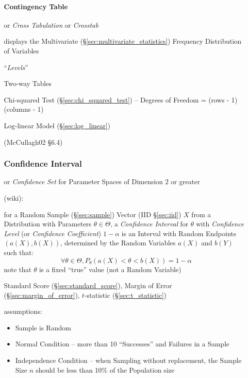 \paragraph{Contingency Table}\label{sec:contingency_table}\hfill

or \emph{Cross Tabulation} or \emph{Crosstab}

displays the Multivariate (\S\ref{sec:multivariate_statistics}) Frequency
Distribution of Variables

``\emph{Levels}''

Two-way Tables

Chi-squared Test (\S\ref{sec:chi_squared_test}) -- Degrees of Freedom =
(rows - 1)(columns - 1)

Log-linear Model (\S\ref{sec:log_linear})

(McCullagh02 \S 6.4)



\subsubsection{Confidence Interval}\label{sec:confidence_interval}

or \emph{Confidence Set} for Parameter Spaces of Dimension $2$ or greater

(wiki):

for a Random Sample (\S\ref{sec:sample}) Vector (IID \S\ref{sec:iid}) $X$ from a
Distribution with Parameters $\theta \in \Theta$, a \emph{Confidence Interval}
for $\theta$ with \emph{Confidence Level} (or \emph{Confidence Coefficient}) $1
- \alpha$ is an Interval with Random Endpoints $(a(X), b(X))$, determined by the
Random Variables $a(X)$ and $b(Y)$ such that:
\[
  \forall \theta \in \Theta, P_\theta(a(X) < \theta < b(X)) = 1 - \alpha
\]
note that $\theta$ is a fixed ``true'' value (not a Random Variable)

\fist Standard Score (\S\ref{sec:standard_score}), Margin of Error
(\S\ref{sec:margin_of_error}), $t$-statistic (\S\ref{sec:t_statistic})

assumptions:
\begin{itemize}
  \item Sample is Random
  \item Normal Condition -- more than 10 ``Successes'' and Failures in a Sample
  \item Independence Condition -- when Sampling without replacement, the Sample
    Size $n$ should be less than 10\% of the Population size
\end{itemize}

